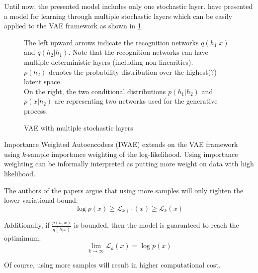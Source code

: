 Until now, the presented model includes only one stochastic layer.
\cite{dlgm:2014} have presented a model for learning through multiple stochastic layers which can be easily applied to the VAE framework as shown in \ref{fig:vae_multiple_layers}.

\begin{figure}[htb]
\centering

  \caption{VAE with multiple stochastic layers }\label{fig:vae_multiple_layers}
  \medskip
  \small
  The left upward arrows indicate the recognition networks $q(h_1|x)$ and $q(h_2|h_1)$.
  Note that the recognition networks can have multiple deterministic layers (including non-linearities).\\

  $p(h_2)$ denotes the probability distribution over the highest(?) latent space.\\

  On the right, the two conditional distributions $p(h_1|h_2)$ and $p(x|h_2)$ are representing two networks used for the generative process.
\end{figure}

Importance Weighted Autoencoders (IWAE) extends on the VAE framework using $k$-sample importance weighting of the log-likelihood.
Using importance weighting can be informally interpreted as putting more weight on data with high likelihood.

The authors of the papers argue that using more samples will only tighten the lower variational bound.
$$
\log p(x) \geq \mathcal{L}_{k+1}(x) \geq \mathcal{L}_{k}(x)
$$

Additionally, if $\frac{p(h,x)}{q(h|x)}$ is bounded, then the model is guaranteed to reach the optimimum:
$$
\lim_{k \rightarrow \infty} \mathcal{L}_{k}(x) = \log p(x)
$$

Of course, using more samples will result in higher computational cost.

